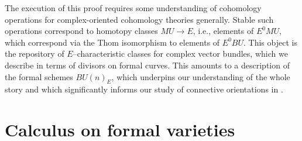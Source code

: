 The execution of this proof requires some understanding of cohomology operations for complex-oriented cohomology theories generally.  Stable such operations correspond to homotopy classes \(MU \to E\), i.e., elements of \(E^0 MU\), which correspond via the Thom isomorphism to elements of \(E^0 BU\).  This object is the repository of \(E\)--characteristic classes for complex vector bundles, which we describe in terms of divisors on formal curves.  This amounts to a description of the formal schemes \(BU(n)_E\), which underpins our understanding of the whole story and which significantly informs our study of connective orientations in .









\section{Calculus on formal varieties}\label{FormalVarietiesLecture}

